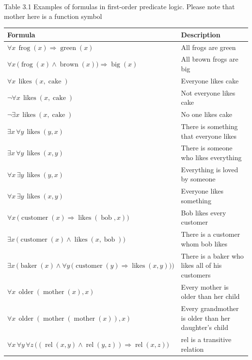 \documentclass[10pt]{book}
\begin{document}
Table 3.1 Examples of formulas in first-order predicate logic. Please note that mother here is a function symbol
\begin{center}
\begin{tabular}{|l|l|}
\hline
Formula & Description \\
\hline
$ \forall x\, \operatorname{frog}(x) \Rightarrow \operatorname{green}(x) $ & All frogs are green \\
\hline
$ \forall x\, \big(\operatorname{frog}(x) \wedge \operatorname{brown}(x)\big) \Rightarrow \operatorname{big}(x) $ & All brown frogs are big \\
\hline
$ \forall x\, \operatorname{likes}(x,\operatorname{cake}) $ & Everyone likes cake \\
\hline
$ \neg \forall x\, \operatorname{likes}(x,\operatorname{cake}) $ & Not everyone likes cake \\
\hline
$ \neg \exists x\, \operatorname{likes}(x,\operatorname{cake}) $ & No one likes cake \\
\hline
$ \exists x\, \forall y\, \operatorname{likes}(y,x) $ & There is something that everyone likes \\
\hline
$ \exists x\, \forall y\, \operatorname{likes}(x,y) $ & There is someone who likes everything \\
\hline
$ \forall x\, \exists y\, \operatorname{likes}(y,x) $ & Everything is loved by someone \\
\hline
$ \forall x\, \exists y\, \operatorname{likes}(x,y) $ & Everyone likes something \\
\hline
$ \forall x\, \big(\operatorname{customer}(x) \Rightarrow \operatorname{likes}(\operatorname{bob},x)\big) $ & Bob likes every customer \\
\hline
$ \exists x\, \big(\operatorname{customer}(x) \wedge \operatorname{likes}(x,\operatorname{bob})\big) $ & There is a customer whom bob likes \\
\hline
$ \exists x\, \Big(\operatorname{baker}(x) \wedge \forall y\, \big(\operatorname{customer}(y) \Rightarrow \operatorname{likes}(x,y)\big)\Big) $ & There is a baker who likes all of his customers \\
\hline
$ \forall x\, \operatorname{older}(\operatorname{mother}(x),x) $ & Every mother is older than her child \\
\hline
$ \forall x\, \operatorname{older}(\operatorname{mother}(\operatorname{mother}(x)),x) $ & Every grandmother is older than her daughter's child \\
\hline
$ \forall x\, \forall y\, \forall z\, \big((\operatorname{rel}(x,y) \wedge \operatorname{rel}(y,z)) \Rightarrow \operatorname{rel}(x,z)\big) $ & rel is a transitive relation \\
\hline
\end{tabular}
\end{center}
\end{document}
